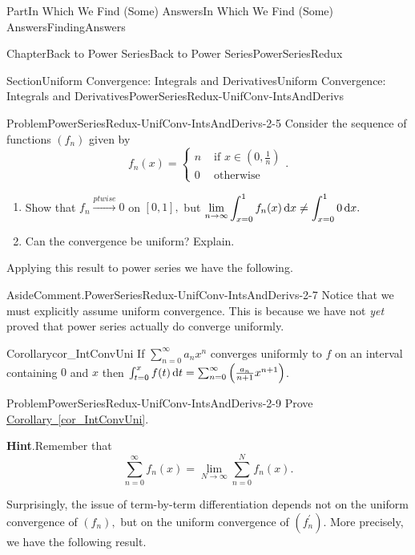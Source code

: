\documentclass[oneside,10pt,]{book}
\newcommand{\blocktitlefont}{\relax}
\newcommand{\xreffont}{\relax}
\numberwithin{equation}{part}
\newcommand{\dx}[1]{\,{\rm d}#1}
\def\limit#1#2#3{{\displaystyle\lim_{#1\rightarrow #2}#3}}
\newcommand{\ptwise}{\stackrel{ptwise}{\longrightarrow}}
\newcommand{\amp}{&}
\begin{document}
\begin{partptx}{Part}{In Which We Find (Some) Answers}{}{In Which We Find (Some) Answers}{}{}{FindingAnswers}
\begin{chapterptx}{Chapter}{Back to Power Series}{}{Back to Power Series}{}{}{PowerSeriesRedux}
\begin{sectionptx}{Section}{Uniform Convergence: Integrals and Derivatives}{}{Uniform Convergence: Integrals and Derivatives}{}{}{PowerSeriesRedux-UnifConv-IntsAndDerivs}
\begin{introduction}{}
\begin{problem}{Problem}{}{PowerSeriesRedux-UnifConv-IntsAndDerivs-2-5}
 Consider the sequence of functions \(\left(f_n\right)\) given by%
\begin{equation*}
f_n(x)= \begin{cases}n\amp \text{ if } x\in\left(0,\frac{1}{n}\right)\\ 0\amp \text{ otherwise } \end{cases} \text{.}
\end{equation*}
%
\begin{enumerate}[label={(\alph*)}]
\item{}Show that \(f_n\ptwise 0\) on \([0,1],\) but \(\limit{n}{\infty}{\int_{x=0}^1f_n(x)\dx{
x}\neq\int_{x=0}^10\dx{ x}.}\)%
\item{}Can the convergence be uniform?  Explain.%
\end{enumerate}
%
\end{problem}
Applying this result to power series we have the following.%
\begin{aside}{Aside}{Comment.}{PowerSeriesRedux-UnifConv-IntsAndDerivs-2-7}%
Notice that we must explicitly assume uniform convergence. This is because we have not \emph{yet} proved that power series actually do converge uniformly.%
\end{aside}
\begin{corollary}{Corollary}{}{}{cor_IntConvUni}%
If \(\sum_{n=0}^\infty a_nx^n\) converges uniformly to \(f\) on an interval containing \(0\) and \(x\) then \(\int_{t=0}^xf(t)\dx{
t}=\sum_{n=0}^\infty\left(\frac{a_n}{n+1}x^{n+1}\right)\).%
\end{corollary}
\begin{problem}{Problem}{}{PowerSeriesRedux-UnifConv-IntsAndDerivs-2-9}%
 Prove \hyperref[cor_IntConvUni]{Corollary~{\xreffont\ref{cor_IntConvUni}}}.%
\par\smallskip%
\noindent\textbf{\blocktitlefont Hint}.\hypertarget{PowerSeriesRedux-UnifConv-IntsAndDerivs-2-9-2}{}\quad{}Remember that%
\begin{equation*}
\displaystyle \sum_{n=0}^\infty f_n(x) =
\lim_{N\rightarrow\infty}\sum_{n=0}^N f_n(x).
\end{equation*}
%
\end{problem}
Surprisingly, the issue of term-by-term differentiation depends not on the uniform convergence of \(\left(f_n\right),\) but on the uniform convergence of \(\left(f^\prime_n\right)\).  More precisely, we have the following result.%

\end{introduction}
\end{sectionptx}
\end{chapterptx}
\end{partptx}
\end{document}
